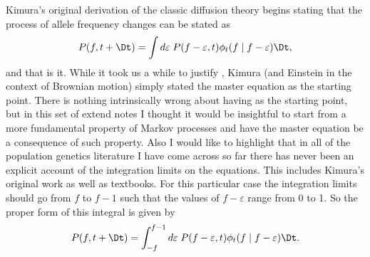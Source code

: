 Kimura's original derivation of the classic diffusion theory begins stating that
the process of allele frequency changes can be stated as
\begin{equation}
  P(f, t + \Dt) = \int d\varepsilon \;
  P(f - \varepsilon, t) \phi_t(f \mid f - \varepsilon) \Dt,
  \label{eq_kimura_master}
\end{equation}
and that is it. While it took us a while to justify ,
Kimura (and Einstein in the context of Brownian motion) simply stated the master
equation as the starting point. There is nothing intrinsically wrong about
having  as the starting point, but in this set of extend
notes I thought it would be insightful to start from a more fundamental property
of Markov processes and have the master equation be a consequence of such
property. Also I would like to highlight that in all of the population genetics
literature I have come across so far there has never been an explicit account of
the integration limits on the equations. This includes Kimura's original work as
well as textbooks. For this particular case the integration limits should go
from $f$ to $f - 1$ such that the values of $f - \varepsilon$ range from 0 to 1.
So the proper form of this integral is given by
\begin{equation}
  P(f, t + \Dt) = \int_{-f}^{f - 1} d\varepsilon \;
  P(f - \varepsilon, t) \phi_t(f \mid f - \varepsilon) \Dt.
  \label{eq_kimura_master_lim}
\end{equation}

